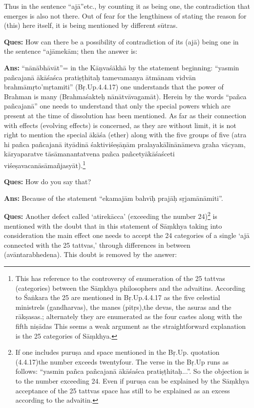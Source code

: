 \newpage

Thus in the sentence “ajā”etc., by counting it as being one, the contradiction that emerges is also not there. Out of fear for the lengthiness of stating the reason for (this) here itself, it is being mentioned by different sūtras.  

\textbf{Ques:} How can there be a possibility of contradiction of its (ajā) being one in the sentence “ajāmekām; then the answer is:

\textbf{Ans:} “nānābhāvāt”= in the Kāṇvaśākhā by the statement beginning: “yasmin pañcajanā ākāśaśca pratiṣṭhitaḥ tamevamanya ātmānam vidvān brahmāmṛto’mṛtamiti” (Bṛ.Up.4.4.17) one understands that the power of Brahman is many (Brahmaśakteḥ nānātvāvagamāt). Herein by the words “pañca pañcajanā” one needs to understand that only the special powers which are present at the time of dissolution has been mentioned. As far as their connection with effects (evolving effects) is concerned, as they are without limit, it is not right to mention the special ākāśa (ether) along with the five groups of five (atra hi pañca pañcajanā  ityādinā śaktiviśeṣāṇām pralayakālīnānāmeva graha vācyam, kāryaparatve tāsāmanantatvena pañca pañcetyākāśaśceti viśeṣavacanāsāmañjasyāt).\footnote{This has reference to the controversy of enumeration of the 25 tattvas (categories)  between the Sāṃkhya philosophers and the advaitins. According to Śaṅkara the 25 are mentioned in Bṛ.Up.4.4.17 as the five celestial ministrels (gandharvas), the manes (pitṛs),the devas, the asuras and the rākṣasas.; alternately they are enumerated as the four castes along with the fifth niṣādas This seems a weak argument as the straightforward explanation is the 25 categories of Sāṃkhya.}

\textbf{Ques:} How do you say that?

\textbf{Ans:} Because of the statement “ekamajām bahvīḥ prajāḥ sṛjamānāmiti”.

\textbf{Ques:} Another defect called ‘atirekācca’ (exceeding the number 24)\footnote{If one includes puruṣa and space mentioned in the Bṛ.Up. quotation (4.4.17)the number exceeds twentyfour. The verse in the Bṛ.Up runs as follows: “yasmin pañca pañcajanā ākāśaśca pratiṣṭhitaḥ...”. So the objection is to the number exceeding 24. Even if puruṣa can be explained by the Sāṃkhya acceptance of the 25 tattvas space has still to be explained as an excess according to the advaitin.} is mentioned with the doubt that in this statement of Sāṃkhya taking into consideration the main effect one needs to accept the 24 categories of a single ‘ajā connected with the 25 tattvas,’  through differences in between (avāntarabhedena).  This doubt is removed by the answer:


